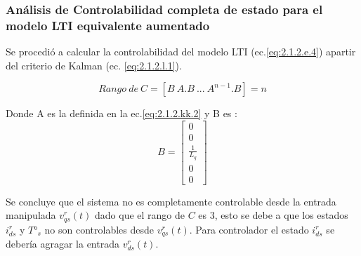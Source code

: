\documentclass[10pt]{article}
\begin{document}
\subsubsection{Análisis de Controlabilidad completa de estado para el modelo LTI equivalente aumentado}
Se procedió a calcular la controlabilidad del modelo LTI (ec.\ref{eq:2.1.2.e.4}) apartir del criterio de Kalman (ec. \ref{eq:2.1.2.l.1}).

	\begin{equation}
		Rango \ de \ C=[B \ A.B \ ... \ A^{n-1}.B]= n
	\label{eq:2.1.2.l.1}
	\end{equation}
	
	Donde A es la definida en la ec.\ref{eq:2.1.2.kk.2} y B es :
	\begin{equation}
		B= \begin{bmatrix}
	0  \\ 
	0 \\ 
	 \frac{1}{L_{q}}\\
	 0\\
	 0
	\end{bmatrix}
	\label{eq:2.1.2.l.2}
	\end{equation}
	
Se concluye que el sistema no es completamente controlable desde la entrada manipulada $v^{r}_{qs}(t)$ dado que el rango de $C$ es 3, esto se debe a que los estados $i^{r}_{ds}$ y $T°_{s}$ no son controlables desde $v^{r}_{qs}(t)$. Para controlador el estado $i^{r}_{ds}$ se debería agragar la entrada $v^{r}_{ds}(t)$.
\end{document}
